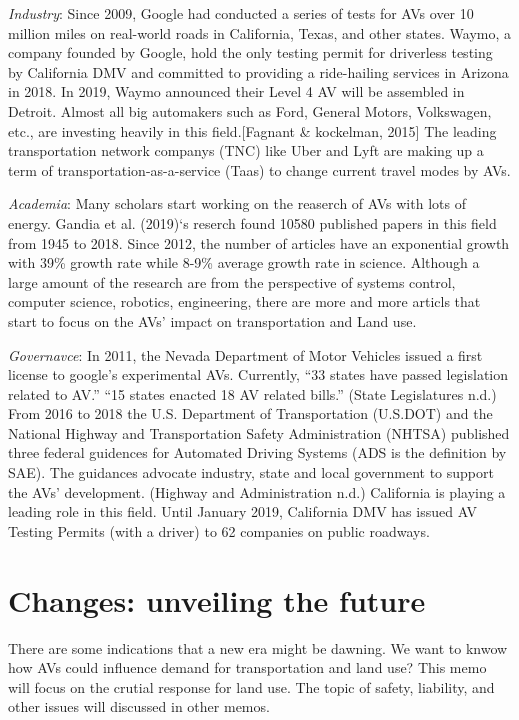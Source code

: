 \documentclass[12pt,]{article}
\begin{document}
\emph{Industry}: Since 2009, Google had conducted a series of tests for
AVs over 10 million miles on real-world roads in California, Texas, and
other states. Waymo, a company founded by Google, hold the only testing
permit for driverless testing by California DMV and committed to
providing a ride-hailing services in Arizona in 2018. In 2019, Waymo
announced their Level 4 AV will be assembled in Detroit. Almost all big
automakers such as Ford, General Motors, Volkswagen, etc., are investing
heavily in this field.{[}Fagnant \& kockelman, 2015{]} The leading
transportation network companys (TNC) like Uber and Lyft are making up a
term of transportation-as-a-service (Taas) to change current travel
modes by AVs.

\emph{Academia}: Many scholars start working on the reaserch of AVs with
lots of energy. Gandia et al. (2019)`s reserch found 10580 published
papers in this field from 1945 to 2018. Since 2012, the number of
articles have an exponential growth with 39\% growth rate while 8-9\%
average growth rate in science. Although a large amount of the research
are from the perspective of systems control, computer science, robotics,
engineering, there are more and more articls that start to focus on the
AVs' impact on transportation and Land use.

\emph{Governavce}: In 2011, the Nevada Department of Motor Vehicles
issued a first license to google's experimental AVs. Currently, ``33
states have passed legislation related to AV.'' ``15 states enacted 18
AV related bills.'' (State Legislatures n.d.) From 2016 to 2018 the U.S.
Department of Transportation (U.S.DOT) and the National Highway and
Transportation Safety Administration (NHTSA) published three federal
guidences for Automated Driving Systems (ADS is the definition by SAE).
The guidances advocate industry, state and local government to support
the AVs' development. (Highway and Administration n.d.) California is
playing a leading role in this field. Until January 2019, California DMV
has issued AV Testing Permits (with a driver) to 62 companies on public
roadways.

\hypertarget{changes-unveiling-the-future}{%
\section{Changes: unveiling the
future}\label{changes-unveiling-the-future}}

There are some indications that a new era might be dawning. We want to
knwow how AVs could influence demand for transportation and land use?
This memo will focus on the crutial response for land use. The topic of
safety, liability, and other issues will discussed in other memos.
\end{document}
